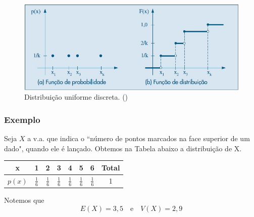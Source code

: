 \documentclass[14pt,aspectratio=1610]{beamer}
\begin{document}
\begin{frame}{}
\frametitle{}
\begin{block}{}
\justifying
\begin{figure}[H]
    \centering
    \includegraphics[scale=0.5]{Figuras/Uniforme}
    \caption{Distribuição uniforme discreta. (\cite{Morettin09})}
  \end{figure}

\end{block}
\end{frame}

\begin{frame}{}
\frametitle{Exemplo}
\begin{block}{}
\justifying
Seja $X$ a v.a. que indica o ``número de pontos marcados na face superior
de um dado", quando ele é lançado. Obtemos na Tabela abaixo a distribuição de X.
\begin{table}[h]
\begin{tabular}{c|c|c|c|c|c|c|c}
\hline
x&1&2&3&4&5&6&Total\\
\hline
$p(x)$&$\frac{1}{6}$&$\frac{1}{6}$&$\frac{1}{6}$&$\frac{1}{6}$&$\frac{1}{6}$&$\frac{1}{6}$&1\\
\hline
\end{tabular}
\end{table}
Notemos que $$E(X)=3,5\quad \textrm{e}\quad V(X)=2,9$$
\end{block}
\end{frame}
\end{document}
